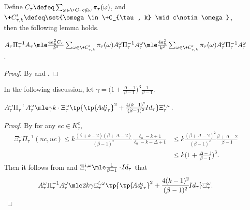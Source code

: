 \documentclass[a4paper,11pt]{article}
\begin{document}
Define $C_\tau\defeq \sum_{\substack{\omega\in \+C_\tau} \\ c\notin \omega}\pi_\tau(\omega)$,
and $\+C'_{\tau, k}\defeq \set{\omega\in \+C_{\tau, k} \mid c\notin\omega}$,
then the following lemma holds.
\begin{lemma}\label{lem:bound-A-tau-i}
 $A_\tau\Pi_\tau^{-1}A_\tau
 \mle
 \frac{4a_k^2C_\tau}{k^2} \sum_{\omega\in\+C'_{\tau, k}} \pi_\tau(\omega) A_\tau^{\omega}\Pi^{-1}_\tau A_\tau^{\omega}
 \mle
 \frac{4a_k^2}{k^2} \sum_{\omega\in\+C'_{\tau, k}} \pi_\tau(\omega) A_\tau^{\omega}\Pi^{-1}_\tau A_\tau^{\omega}$.
\end{lemma}
\begin{proof}
    By  and .
\end{proof}

In the following discussion,
let $\gamma=\bigg( 1+ \frac{\Delta-1}{\beta-1} \bigg)^3\frac{1}{\beta-1}$.
\begin{lemma}\label{lem:bound-A-tau-i-omega-square}
	$ A_\tau^{\omega} \Pi_\tau^{-1} A_\tau^{\omega}
    \mle \gamma k\cdot \Xi_\tau^{\omega}\tp{\tp{\!{Adj}_\tau}^2
    +
    \frac{4(k-1)^2}{(\beta-1)^2}\!{Id}_\tau}\Xi_\tau^{i,\omega}$.
\end{lemma}
\begin{proof}
	By  for any $ec \in K_\tau^{c}$,
	\begin{align*}
			\Xi_\tau^{\omega}\Pi_\tau^{-1}(uc, uc)\leq
            k \frac{(\beta+k-2)(\beta+\Delta-2)}{(\beta-1)^2}\frac{\ell_u - k + 1}{\ell_u-k-\Delta + 1}
            &\le
            k \frac{(\beta+\Delta-2)^2}{(\beta-1)^2}\frac{\beta + \Delta-2}{\beta-1}
            \\&\le k\bigg( 1+ \frac{\Delta-1}{\beta-1} \bigg)^3.
	\end{align*}
	Then it follows from  and $\Xi_\tau^{i,\omega}\mle \frac{1}{\beta-1}\cdot \!{Id}_{\tau}$ that
\[
	 A_\tau^{\omega} \Pi_\tau^{-1} A_\tau^{\omega}
     \mle
     2 k\gamma \Xi_\tau^{i,\omega}\tp{\tp{\!{Adj}_\tau}^2  + \frac{4(k-1)^2}{(\beta-1)^2}\!{Id}_\tau}\Xi_\tau^{\omega}.
     \qedhere
    \]


\end{proof}
\end{document}
